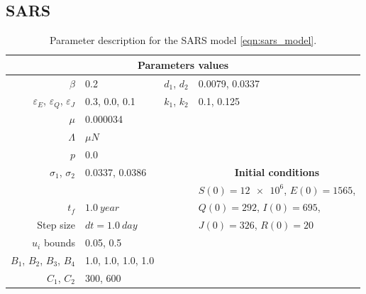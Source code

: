 \subsection*{SARS}

\begin{table}[H]
    \begin{center}
      \begin{tabular}{@{}rlrl@{}}
        \toprule
        \multicolumn{4}{c}{\bf{Parameters values}}
        \\
        \midrule
        $\beta$
          & \num{0.2}
          & $d_1$, $d_2$
          & \num{0.0079}, \num{0.0337}
        \\
        $\varepsilon_E$, 
        $\varepsilon_Q$,
        $\varepsilon_J$
          & \num{0.3}, \num{0.0}, \num{0.1}
          &
          $k_1$, $k_2$ 
          & 
            \num{0.1},
            \num{0.125}
          \\
        $\mu$
          & \num{0.000034}
        \\
        $\Lambda$
          & $\mu N$
        \\
        $p$
          & \num{0.0}
        \\
        $\sigma_1$, $\sigma_2$
          & \num{0.0337}, \num{0.0386}
          && \multicolumn{1}{c}{\bf{Initial conditions}}
        \\
        \cmidrule{4-4}
          &&& $S(0)=\num{12e6}$, $E(0)=1565$,
         \\
        $t_f$
          & $\SI{1.0}{year}$
          && $Q(0)=292$, $I(0)=\num{695}$,
        \\
        Step size
        & $dt=\SI{1.0}{day}$
        && $J(0)=\num{326}$, $R(0)=\num{20}$
        \\
        $u_i$ bounds
          & \num{.05}, \num{0.5}
        \\
        $B_1$, $B_2$, $B_3$, $B_4$
        & \num{1.0}, \num{1.0}, \num{1.0}, \num{1.0}
        \\
        $C_1$, $C_2$
        & \num{300}, \num{600}
        \\
        \bottomrule
      \end{tabular}
     \caption{Parameter description for the SARS model
     \eqref{eqn:sars_model}.}
     \label{tbl:sars_table}
     \end{center}
\end{table}

